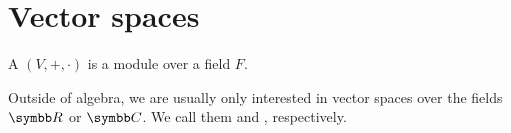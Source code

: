 \section{Vector spaces}\label{sec:vector_spaces}

\begin{definition}\label{def:vector_space}
  A  \( (V, +, \cdot) \) is a module over a field \( F \).
\end{definition}

\begin{note}\label{note:real_vector_space}
  Outside of algebra, we are usually only interested in vector spaces over the fields \( \BB{R} \) or \( \BB{C} \). We call them  and , respectively.
\end{note}
